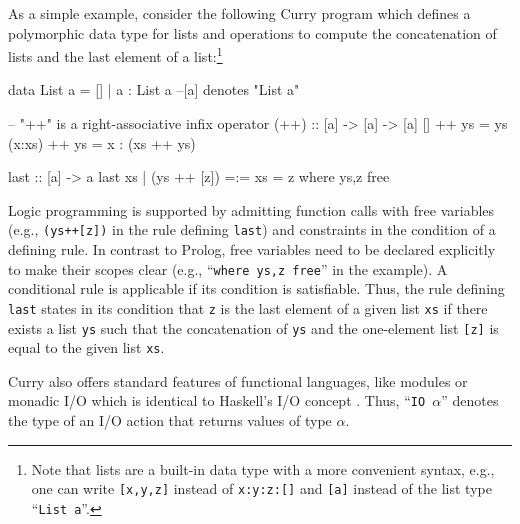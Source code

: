 \documentclass[english]{lni}
\newcommand{\code}[1]{\texttt{#1}}
\newcommand{\ccode}[1]{``\code{#1}''}
\begin{document}
As a simple example, consider the following Curry program
which defines a polymorphic 
data type for lists and operations to compute the 
concatenation of lists and the last element of a list:\footnote{Note
that lists are a built-in data type with a more convenient syntax, 
e.g., one can write \code{[x,y,z]} instead of \code{x:y:z:[]}
and \code{[a]} instead of the list type \ccode{List a}.}
%
\begin{curry}
data List a = [] | a : List a    --[a] denotes "List a"

-- "++" is a right-associative infix operator
(++) :: [a] -> [a] -> [a]
[]     ++ ys = ys
(x:xs) ++ ys = x : (xs ++ ys)

last :: [a] -> a
last xs | (ys ++ [z]) =:= xs
        = z                    where ys,z free
\end{curry}
%
Logic programming is supported by admitting function calls with free
variables (e.g., \code{(ys++[z])} in the rule defining \code{last})
and constraints in the condition of a defining rule. In contrast to
Prolog, free variables need to be declared explicitly to make their
scopes clear (e.g., \ccode{where ys,z free} in the example).
A conditional rule is applicable if its condition  is satisfiable.
Thus, the rule defining \code{last} states in its condition
that \code{z} is the last element of a given list
\code{xs} if there exists a list \code{ys}
such that the concatenation of \code{ys} and the one-element list
\code{[z]} is equal to the given list \code{xs}.

Curry also offers standard features of
functional languages, like modules or monadic I/O
which is identical to Haskell's I/O concept \cite{Wadler97}.
Thus, \ccode{IO $\alpha$} denotes the type of an I/O action that returns values
of type $\alpha$.
\end{document}
